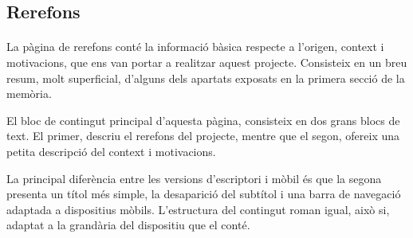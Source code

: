 \subsection{Rerefons}

    \paragraph{}
    La pàgina de rerefons conté la informació bàsica respecte a l'origen, context i motivacions, que ens van portar a realitzar aquest projecte. Consisteix en un breu resum, molt superficial, d’alguns dels apartats exposats en la primera secció de la memòria.

    El bloc de contingut principal d'aquesta pàgina, consisteix en dos grans blocs de text. El primer, descriu el rerefons del projecte, mentre que el segon, ofereix una petita descripció del context i motivacions.

    La principal diferència entre les versions d'escriptori i mòbil és que la segona presenta un títol més simple, la desaparició del subtítol i una barra de navegació adaptada a dispositius mòbils. L'estructura del contingut roman igual, això si, adaptat a la grandària del dispositiu que el conté.
